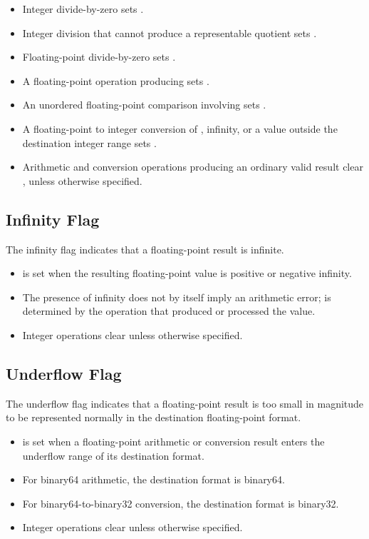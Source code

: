 \begin{itemize}
\item Integer divide-by-zero sets .
\item Integer division that cannot produce a representable quotient sets
.
\item Floating-point divide-by-zero sets .
\item A floating-point operation producing  sets .
\item An unordered floating-point comparison involving  sets
.
\item A floating-point to integer conversion of , infinity, or a
value outside the destination integer range sets .
\item Arithmetic and conversion operations producing an ordinary valid result
clear , unless otherwise specified.
\end{itemize}

\subsection{Infinity Flag}

The infinity flag  indicates that a floating-point result is infinite.

\begin{itemize}
\item {} is set when the resulting floating-point value is positive or
negative infinity.
\item The presence of infinity does not by itself imply an arithmetic error;
 is determined by the operation that produced or processed the
value.
\item Integer operations clear  unless otherwise specified.
\end{itemize}

\subsection{Underflow Flag}

The underflow flag  indicates that a floating-point result is too small
in magnitude to be represented normally in the destination floating-point
format.

\begin{itemize}
\item {} is set when a floating-point arithmetic or conversion result
enters the underflow range of its destination format.
\item For binary64 arithmetic, the destination format is binary64.
\item For binary64-to-binary32 conversion, the destination format is binary32.
\item Integer operations clear  unless otherwise specified.
\end{itemize}

